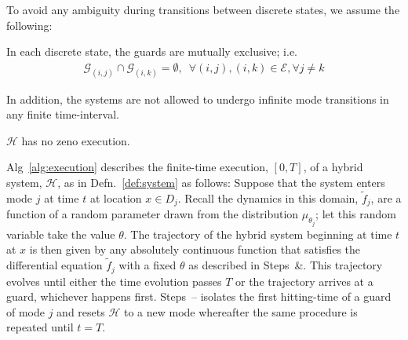 To avoid any ambiguity during transitions between discrete states, we assume the following:
\begin{assump}
    In each discrete state, the guards are mutually exclusive; i.e.
    \begin{align}
    \mathcal G_{(i,j)}\cap \mathcal G_{(i,k)}=\emptyset,\phantom{8}\forall (i,j),(i,k)\in \mathcal E, \forall j\ne k
    \end{align}
\end{assump}
In addition, the systems are not allowed to undergo infinite mode transitions in any finite time-interval.
\begin{assump}
  $\mathcal H$ has no zeno execution.
  \label{assump:zeno}
\end{assump}
Alg~\ref{alg:execution} describes the finite-time execution, $[0,T]$, of a hybrid system, $\mathcal H$, as in Defn.~\ref{def:system} as follows:
Suppose that the system enters mode $j$ at time $t$ at location $x \in D_j$. 
Recall the dynamics in this domain, $\tilde f_j$, are a function of a random parameter drawn from the distribution $\mu_{\theta_j}$; let this random variable take the value $\theta$. 
The trajectory of the hybrid system beginning at time $t$ at $x$ is then given by any absolutely continuous function that satisfies the differential equation $\tilde f_j$ with a fixed $\theta$ as described in Steps~\&.
This trajectory evolves until either the time evolution passes $T$ or the trajectory arrives at a guard, whichever happens first.
Steps~-- isolates the first hitting-time of a guard of mode $j$ and resets $\mathcal H$ to a new mode whereafter the same procedure is repeated until $t=T$.



